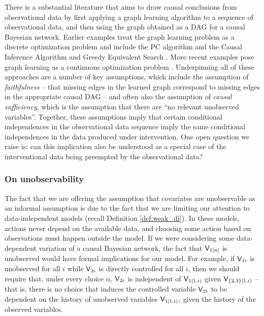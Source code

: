 
There is a substantial literature that aims to draw causal conclusions from observational data by first applying a graph learning algorithm to a sequence of observational data, and then using the graph obtained as a DAG for a causal Bayesian network. Earlier examples treat the graph learning problem as a discrete optimization problem and include the PC algorithm and the Causal Inference Algorithm \citet[Ch. 5\& 6]{spirtes_causation_1993} and Greedy Equivalent Search \citet{chickering_optimal_2003,chickering_learning_2002}. More recent examples pose graph learning as a continuous optimization problem \citet{zheng_dags_2018,ng_graph_2019}. Underpinning all of these approaches are a number of key assumptions, which include the assumption of \emph{faithfulness} -- that missing edges in the learned graph correspond to missing edges in the appropriate causal DAG -- and often also the assumption of \emph{causal sufficiency}, which is the assumption that there are ``no relevant unobserved variables''. Together, these assumptions imply that certain conditional independences in the observational data sequence imply the same conditional independences in the data produced under intervention. One open question we raise is: can this implication also be understood as a special case of the interventional data being preempted by the observational data?

\subsubsection{On unobservability}\label{sec:on_unobservability}

The fact that we are offering the assumption that covariates are unobservable as an informal assumption is due to the fact that we are limiting our attention to data-independent models (recall Definition \ref{def:weak_di}). In these models, actions never depend on the available data, and choosing some action based on observations must happen outside the model. If we were considering some data-dependent variation of a causal Bayesian network, the fact that $\mathsf{V}_{1[n]}$ is unobserved would have formal implications for our model. For example, if $\mathsf{V}_{1i}$ is unobserved for all $i$ while $\mathsf{V}_{2i}$ is directly controlled for all $i$, then we should require that, under every choice $\alpha$, $\mathsf{V}_{2i}$ is independent of $\mathsf{V}_{1[1,i)}$ given $\mathsf{V}_{\{2,3\}[1,i)}$ -- that is, there is no choice that induces the controlled variable $\mathsf{V}_{2i}$ to be dependent on the history of unobserved variables $\mathsf{V}_{1[1,i)}$, given the history of the observed variables.

